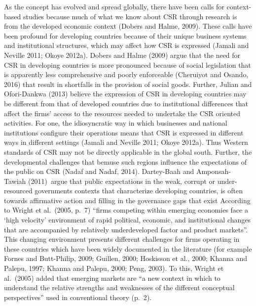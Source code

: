 \documentclass[
]{mitthesis}
\begin{document}
As the concept has evolved and spread globally, there have been calls for context-based studies because much of what we know about CSR through research is from the developed economic context (Dobers and Halme, 2009). These calls have been profound for developing countries because of their unique business systems and institutional structures, which may affect how CSR is expressed (Jamali and Neville 2011; Okoye 2012a). Dobers and Halme (2009) argue that the need for CSR in developing countries is more pronounced because of social legislation that is apparently less comprehensive and poorly enforceable (Cheruiyot and Osando, 2016) that result in shortfalls in the provision of social goods. Further, Julian and Ofori-Dankwa (2013) believe the expression of CSR in developing countries may be different from that of developed countries due to institutional differences that affect the firms' access to the resources needed to undertake the CSR oriented activities.
For one, the idiosyncratic way in which businesses and national institutions configure their operations means that CSR is expressed in different ways in different settings (Jamali and Neville 2011; Okoye 2012a). Thus Western standards of CSR may not be directly applicable in the global south. Further, the developmental challenges that bemuse such regions influence the expectations of the public on CSR (Nadaf and Nadaf, 2014). Dartey-Baah and Amponsah-Tawiah (2011)~argue that public expectations in the weak, corrupt or under-resourced governments contexts that characterize developing countries, is often towards affirmative action and filling in the governance gaps that exist
According to Wright et al.~(2005, p.~7) ``firms competing within emerging economies face a `high velocity' environment of rapid political, economic, and institutional changes that are accompanied by relatively underdeveloped factor and product markets''. This changing environment presents different challenges for firms operating in these countries which have been widely documented in the literature (for example Fornes and Butt-Philip, 2009; Guillen, 2000; Hoskisson et al., 2000; Khanna and Palepu, 1997; Khanna and Palepu, 2000; Peng, 2003). To this, Wright et al.~(2005) added that emerging markets are ``a new context in which to understand the relative strengths and weaknesses of the different conceptual perspectives'' used in conventional theory (p.~2).
\end{document}
